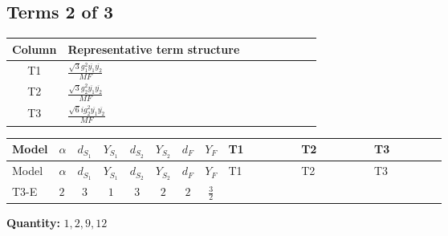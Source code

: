 \documentclass[8pt]{article}
\begin{document}
\begin{landscape}
\subsection*{Terms 2 of 3}
\begin{center}
\begin{tabular}{@{}c >{\raggedright\arraybackslash}p{0.82\linewidth}@{}}
\toprule
Column & Representative term structure \\
\midrule
T1 & \(\displaystyle \frac{\sqrt{3} g_{1}^{2} \overline{y_{1}} \overline{y_{2}}}{MF}\) \\
\midrule
T2 & \(\displaystyle \frac{\sqrt{3} g_{2}^{2} \overline{y_{1}} \overline{y_{2}}}{MF}\) \\
\midrule
T3 & \(\displaystyle \frac{\sqrt{6} i g_{2}^{2} \overline{y_{1}} \overline{y_{2}}}{MF}\) \\
\midrule
\bottomrule
\end{tabular}
\end{center}
\smallskip
\tiny
\begin{longtable}{@{}llcccccc >{\raggedright\arraybackslash}p{0.21\linewidth} >{\raggedright\arraybackslash}p{0.21\linewidth} >{\raggedright\arraybackslash}p{0.21\linewidth}@{}}
\toprule
Model & $\alpha$ & $d_{S_1}$ & $Y_{S_1}$ & $d_{S_2}$ & $Y_{S_2}$ & $d_F$ & $Y_F$ & T1 & T2 & T3 \\
\midrule
\endfirsthead
\toprule
Model & $\alpha$ & $d_{S_1}$ & $Y_{S_1}$ & $d_{S_2}$ & $Y_{S_2}$ & $d_F$ & $Y_F$ & T1 & T2 & T3 \\
\midrule
\endhead
T3-E & $2$ & $3$ & $1$ & $3$ & $2$ & $2$ & $\frac{3}{2}$ & \scriptsize\adjustbox{max width=\linewidth}{$\begin{gathered} \frac{9 \sqrt{3} g_{1}^{2} \overline{y_{1}} \overline{y_{2}}}{8 MF}\end{gathered}$} & \scriptsize\adjustbox{max width=\linewidth}{$\begin{gathered} \frac{15 \sqrt{3} g_{2}^{2} \overline{y_{1}} \overline{y_{2}}}{8 MF}\end{gathered}$} & \scriptsize\adjustbox{max width=\linewidth}{$\begin{gathered} - \frac{\sqrt{6} i g_{2}^{2} \overline{y_{1}} \overline{y_{2}}}{6 MF}\end{gathered}$} \\
\midrule
\bottomrule
\end{longtable}
\clearpage
\noindent\textbf{Quantity: }$\mathrm{1,2,9,12}$\par\smallskip

\end{landscape}
\end{document}
